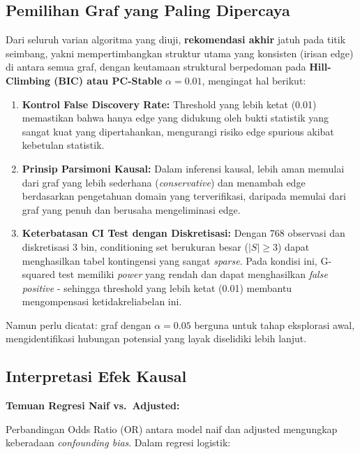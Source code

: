 \documentclass[
  11pt,
]{article}
\begin{document}
\subsection{Pemilihan Graf yang Paling
Dipercaya}\label{pemilihan-graf-yang-paling-dipercaya}

Dari seluruh varian algoritma yang diuji, \textbf{rekomendasi akhir}
jatuh pada titik seimbang, yakni mempertimbangkan struktur utama yang
konsisten (irisan edge) di antara semua graf, dengan keutamaan
struktural berpedoman pada \textbf{Hill-Climbing (BIC) atau PC-Stable}
\(\alpha=0.01\), mengingat hal berikut:

\begin{enumerate}
\def\labelenumi{\arabic{enumi}.}
\item
  \textbf{Kontrol False Discovery Rate:} Threshold yang lebih ketat
  (0.01) memastikan bahwa hanya edge yang didukung oleh bukti statistik
  yang sangat kuat yang dipertahankan, mengurangi risiko edge spurious
  akibat kebetulan statistik.
\item
  \textbf{Prinsip Parsimoni Kausal:} Dalam inferensi kausal, lebih aman
  memulai dari graf yang lebih sederhana (\emph{conservative}) dan
  menambah edge berdasarkan pengetahuan domain yang terverifikasi,
  daripada memulai dari graf yang penuh dan berusaha mengeliminasi edge.
\item
  \textbf{Keterbatasan CI Test dengan Diskretisasi:} Dengan 768
  observasi dan diskretisasi 3 bin, conditioning set berukuran besar
  (\(|S| \geq 3\)) dapat menghasilkan tabel kontingensi yang sangat
  \emph{sparse}. Pada kondisi ini, G-squared test memiliki \emph{power}
  yang rendah dan dapat menghasilkan \emph{false positive} - sehingga
  threshold yang lebih ketat (0.01) membantu mengompensasi
  ketidakreliabelan ini.
\end{enumerate}

Namun perlu dicatat: graf dengan \(\alpha = 0.05\) berguna untuk tahap
eksplorasi awal, mengidentifikasi hubungan potensial yang layak
diselidiki lebih lanjut.

\subsection{Interpretasi Efek Kausal}\label{interpretasi-efek-kausal}

\textbf{Temuan Regresi Naif vs.~Adjusted:}

Perbandingan Odds Ratio (OR) antara model naif dan adjusted mengungkap
keberadaan \emph{confounding bias}. Dalam regresi logistik:
\end{document}

